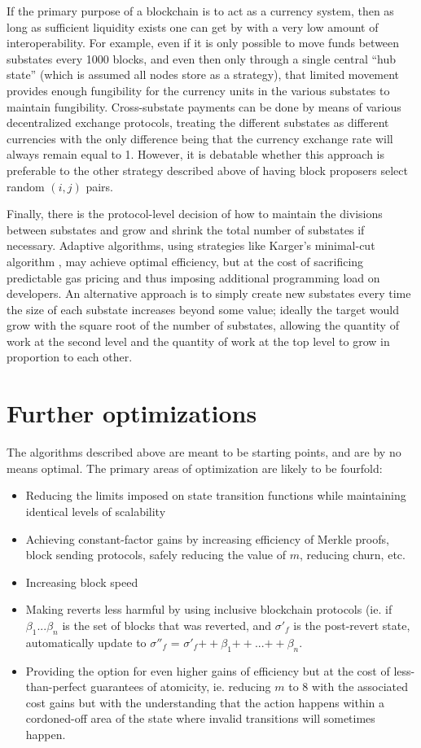 \documentclass[11pt,a4paper]{report}
\theoremstyle{plain}
\theoremstyle{definition}
\theoremstyle{remark}
\begin{document}
If the primary purpose of a blockchain is to act as a currency system, then as long as sufficient liquidity exists one can get by with a very low amount of interoperability. For example, even if it is only possible to move funds between substates every 1000 blocks, and even then only through a single central ``hub state'' (which is assumed all nodes store as a strategy), that limited movement provides enough fungibility for the currency units in the various substates to maintain fungibility. Cross-substate payments can be done by means of various decentralized exchange protocols, treating the different substates as different currencies with the only difference being that the currency exchange rate will always remain equal to 1. However, it is debatable whether this approach is preferable to the other strategy described above of having block proposers select random $(i, j)$ pairs.

Finally, there is the protocol-level decision of how to maintain the divisions between substates and grow and shrink the total number of substates if necessary. Adaptive algorithms, using strategies like Karger's minimal-cut algorithm \cite{karger}, may achieve optimal efficiency, but at the cost of sacrificing predictable gas pricing and thus imposing additional programming load on developers. An alternative approach is to simply create new substates every time the size of each substate increases beyond some value; ideally the target would grow with the square root of the number of substates, allowing the quantity of work at the second level and the quantity of work at the top level to grow in proportion to each other.

\chapter{Further optimizations}

The algorithms described above are meant to be starting points, and are by no means optimal. The primary areas of optimization are likely to be fourfold:

\begin{itemize}
\item
Reducing the limits imposed on state transition functions while maintaining identical levels of scalability
\item
Achieving constant-factor gains by increasing efficiency of Merkle proofs, block sending protocols, safely reducing the value of $m$, reducing churn, etc.
\item
Increasing block speed
\item
Making reverts less harmful by using inclusive blockchain protocols (ie. if $\beta_1 ... \beta_n$ is the set of blocks that was reverted, and $\sigma'_f$ is the post-revert state, automatically update to $\sigma''_f$ = $\sigma'_f {++} \beta_1 {++} ... {++} \beta_n$.
\item
Providing the option for even higher gains of efficiency but at the cost of less-than-perfect guarantees of atomicity, ie. reducing $m$ to $8$ with the associated cost gains but with the understanding that the action happens within a cordoned-off area of the state where invalid transitions will sometimes happen.
\end{itemize}
\end{document}
